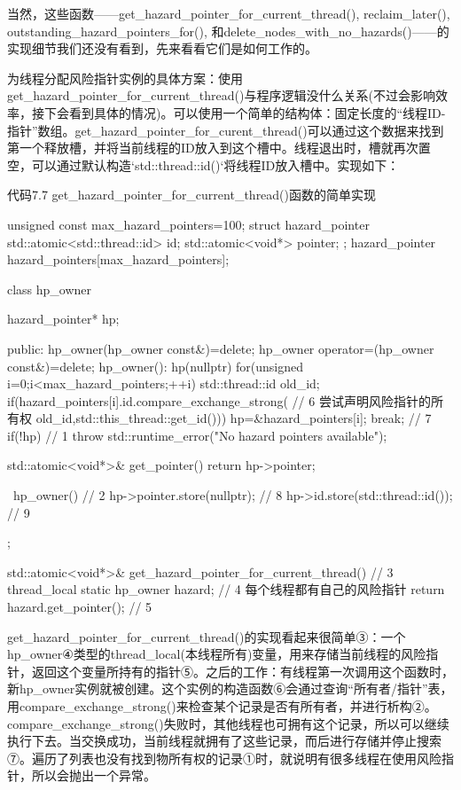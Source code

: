 当然，这些函数——get\_hazard\_pointer\_for\_current\_thread(), reclaim\_later(), outstanding\_hazard\_pointers\_for(), 和delete\_nodes\_with\_no\_hazards()——的实现细节我们还没有看到，先来看看它们是如何工作的。

为线程分配风险指针实例的具体方案：使用get\_hazard\_pointer\_for\_current\_thread()与程序逻辑没什么关系(不过会影响效率，接下会看到具体的情况)。可以使用一个简单的结构体：固定长度的“线程ID-指针”数组。get\_hazard\_pointer\_for\_curent\_thread()可以通过这个数据来找到第一个释放槽，并将当前线程的ID放入到这个槽中。线程退出时，槽就再次置空，可以通过默认构造`std::thread::id()`将线程ID放入槽中。实现如下：

代码7.7 get\_hazard\_pointer\_for\_current\_thread()函数的简单实现

\begin{cpp}
unsigned const max_hazard_pointers=100;
struct hazard_pointer
{
  std::atomic<std::thread::id> id;
  std::atomic<void*> pointer;
};
hazard_pointer hazard_pointers[max_hazard_pointers];

class hp_owner
{
  hazard_pointer* hp;

public:
  hp_owner(hp_owner const&)=delete;
  hp_owner operator=(hp_owner const&)=delete;
  hp_owner():
    hp(nullptr)
  {
    for(unsigned i=0;i<max_hazard_pointers;++i)
    {
      std::thread::id old_id;
      if(hazard_pointers[i].id.compare_exchange_strong(  // 6 尝试声明风险指针的所有权
         old_id,std::this_thread::get_id()))
      {
        hp=&hazard_pointers[i];
        break;  // 7
      }
    }
    if(!hp)  // 1
    {
      throw std::runtime_error("No hazard pointers available");
    }
  }

  std::atomic<void*>& get_pointer()
  {
    return hp->pointer;
  }

  ~hp_owner()  // 2
  {
    hp->pointer.store(nullptr);  // 8
    hp->id.store(std::thread::id());  // 9
  }
};

std::atomic<void*>& get_hazard_pointer_for_current_thread()  // 3
{
  thread_local static hp_owner hazard;  // 4 每个线程都有自己的风险指针
  return hazard.get_pointer();  // 5
}
\end{cpp}

get\_hazard\_pointer\_for\_current\_thread()的实现看起来很简单③：一个hp\_owner④类型的thread\_local(本线程所有)变量，用来存储当前线程的风险指针，返回这个变量所持有的指针⑤。之后的工作：有线程第一次调用这个函数时，新hp\_owner实例就被创建。这个实例的构造函数⑥会通过查询“所有者/指针”表，用compare\_exchange\_strong()来检查某个记录是否有所有者，并进行析构②。compare\_exchange\_strong()失败时，其他线程也可拥有这个记录，所以可以继续执行下去。当交换成功，当前线程就拥有了这些记录，而后进行存储并停止搜索⑦。遍历了列表也没有找到物所有权的记录①时，就说明有很多线程在使用风险指针，所以会抛出一个异常。

